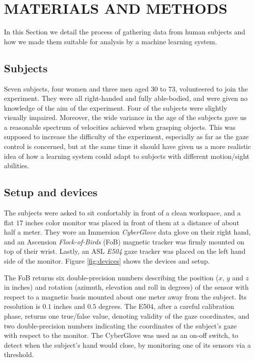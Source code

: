 \documentclass[a4paper,10pt,conference]{ieeeconf}
\begin{document}
\section{MATERIALS AND METHODS}
\label{sec:mat}

In this Section we detail the process of gathering data from human
subjects and how we made them suitable for analysis by a machine
learning system.

\subsection{Subjects}

Seven subjects, four women and three men aged $30$ to $73$,
volunteered to join the experiment. They were all right-handed and
fully able-bodied, and were given no knowledge of the aim of the
experiment. Four of the subjects were slightly visually
impaired. Moreover, the wide variance in the age of the subjects gave
us a reasonable spectrum of velocities achieved when grasping objects.
This was supposed to increase the difficulty of the experiment,
especially as far as the gaze control is concerned, but at the same
time it should have given us a more realistic idea of how a learning
system could adapt to subjects with different motion/sight abilities.

\subsection{Setup and devices}

The subjects were asked to sit confortably in front of a clean
workspace, and a flat $17$ inches color monitor was placed in front of
them at a distance of about half a meter. They wore an Immersion
\emph{CyberGlove} data glove \cite{cyberglove} on their right hand,
and an Ascension \emph{Flock-of-Birds} (FoB) \cite{fob} magnetic
tracker was firmly mounted on top of their wrist. Lastly, an ASL
\emph{E504} gaze tracker \cite{e504} was placed on the left hand side
of the monitor. Figure \ref{fig:devices} shows the devices and setup.

The FoB returns six double-precision numbers describing the position
($x$, $y$ and $z$ in inches) and rotation (azimuth, elevation and roll
in degrees) of the sensor with respect to a magnetic basis mounted
about one meter away from the subject. Its resolution is $0.1$ inches
and $0.5$ degrees. The E504, after a careful calibration phase,
returns one true/false value, denoting validity of the gaze
coordinates, and two double-precision numbers indicating the
coordinates of the subject's gaze with respect to the monitor. The
CyberGlove was used as an on-off switch, to detect when the subject's
hand would close, by monitoring one of its sensors via a threshold.
\end{document}
